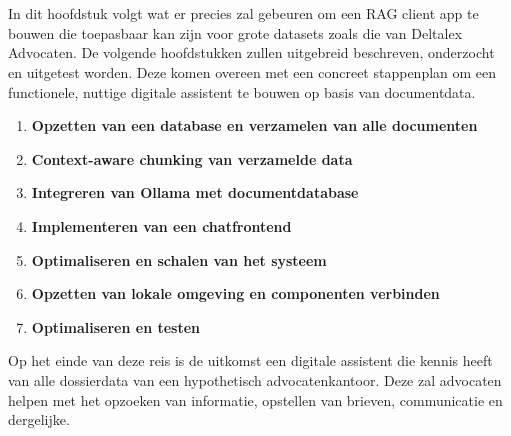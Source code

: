 
\chapter{}%
\label{ch:methodologie}


In dit hoofdstuk volgt wat er precies zal gebeuren om een RAG client app te bouwen die toepasbaar kan zijn voor grote datasets zoals die van Deltalex Advocaten. 
De volgende hoofdstukken zullen uitgebreid beschreven, onderzocht en uitgetest worden. 
Deze komen overeen met een concreet stappenplan om een functionele, nuttige digitale assistent te bouwen op basis van documentdata. 

\begin{enumerate}
    \item \textbf{Opzetten van een database en verzamelen van alle documenten}
    \item \textbf{Context-aware chunking van verzamelde data}
    \item \textbf{Integreren van Ollama met documentdatabase}
    \item \textbf{Implementeren van een chatfrontend}
    \item \textbf{Optimaliseren en schalen van het systeem}
    \item \textbf{Opzetten van lokale omgeving en componenten verbinden}
    \item \textbf{Optimaliseren en testen}
\end{enumerate} 

Op het einde van deze reis is de uitkomst een digitale assistent die kennis heeft van alle dossierdata van een hypothetisch advocatenkantoor. 
Deze zal advocaten helpen met het opzoeken van informatie, opstellen van brieven, communicatie en dergelijke. 


